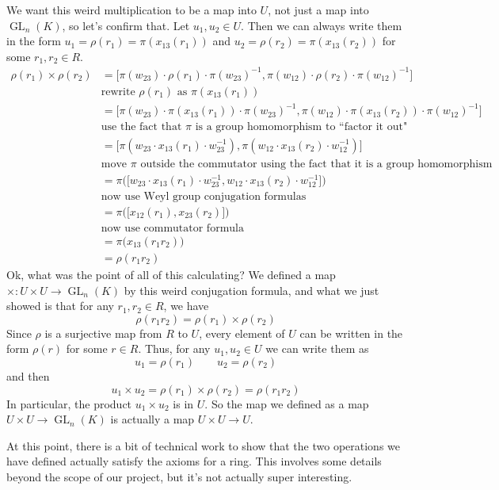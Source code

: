 \documentclass[12pt]{article}
\theoremstyle{definition}
\newcommand{\lp}{\left(}
\newcommand{\rp}{\right)}
\newcommand{\inv}{^{-1}}
\DeclareMathOperator{\GL}{GL}
\begin{document}
We want this weird multiplication to be a map into $U$, not just a map into $\GL_n(K)$, so let's confirm that. Let $u_1, u_2 \in U$. Then we can always write them in the form $u_1 = \rho(r_1) = \pi(x_{13}(r_1))$ and $u_2 = \rho(r_2) = \pi(x_{13}(r_2))$ for some $r_1, r_2 \in R$.
\begin{align*}
	\rho(r_1) \times \rho(r_2) &= \Big[ \pi(w_{23}) \cdot \rho(r_1) \cdot \pi(w_{23}) \inv, \pi(w_{12}) \cdot \rho(r_2) \cdot \pi(w_{12}) \inv \Big] \\
	&\text{rewrite $\rho(r_1)$ as $\pi(x_{13}(r_1))$} \\
	&= \Big[ \pi( w_{23}) \cdot \pi(x_{13}(r_1)) \cdot \pi( w_{23} ) \inv ,  \pi(w_{12}) \cdot \pi( x_{13}(r_2) ) \cdot \pi( w_{12}) \inv \Big]  \\
	&\text{use the fact that $\pi$ is a group homomorphism to ``factor it out"} \\
	&= \Big[ \pi \lp w_{23} \cdot x_{13}(r_1) \cdot w_{23} \inv \rp, \pi \lp w_{12} \cdot x_{13}(r_2) \cdot w_{12} \inv \rp \Big]  \\
	&\text{move $\pi$ outside the commutator using the fact that it is a group homomorphism} \\
	&= \pi \Big( \big[ w_{23} \cdot x_{13}(r_1) \cdot w_{23} \inv, w_{12} \cdot x_{13}(r_2) \cdot w_{12} \inv \big] \Big) \\
	& \text{now use Weyl group conjugation formulas} \\
	&= \pi \Big( \big[ x_{12}(r_1), x_{23}(r_2) \big] \Big) \\
	& \text{now use commutator formula } \\
	&= \pi \Big( x_{13}(r_1 r_2) \Big)  \\
	&= \rho(r_1 r_2)	
\end{align*}
Ok, what was the point of all of this calculating? We defined a map $\times:U \times U \to \GL_n(K)$ by this weird conjugation formula, and what we just showed is that for any $r_1, r_2 \in R$, we have
\[
	\rho(r_1 r_2) = \rho(r_1) \times \rho(r_2)
\]
Since $\rho$ is a surjective map from $R$ to $U$, every element of $U$ can be written in the form $\rho(r)$ for some $r \in R$. Thus, for any $u_1, u_2 \in U$ we can write them as
\[
	u_1 = \rho(r_1) \qquad u_2 = \rho(r_2)
\]
and then
\[
	u_1 \times u_2 = \rho(r_1) \times \rho(r_2) = \rho(r_1 r_2)
\]
In particular, the product $u_1 \times u_2$ is in $U$. So the map we defined as a map $U \times U \to \GL_n(K)$ is actually a map $U \times U \to U$.

At this point, there is a bit of technical work to show that the two operations we have defined actually satisfy the axioms for a ring. This involves some details beyond the scope of our project, but it's not actually super interesting. 
\end{document}
